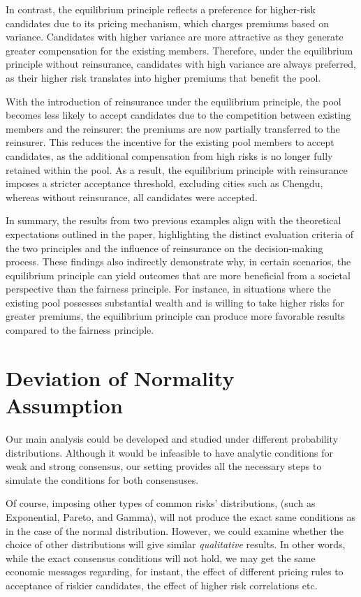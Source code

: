 \documentclass[fleqn,mnsc,nonblindrev]{informs4}
\begin{document}
In contrast, the equilibrium principle reflects a preference for higher-risk candidates due to its pricing mechanism, which charges premiums based on variance. Candidates with higher variance are more attractive as they generate greater compensation for the existing members. Therefore, under the equilibrium principle without reinsurance, candidates with high variance are always preferred, as their higher risk translates into higher premiums that benefit the pool.

With the introduction of reinsurance under the equilibrium principle, the pool becomes less likely to accept candidates due to the competition between existing members and the reinsurer: the premiums are now partially transferred to the reinsurer. This reduces the incentive for the existing pool members to accept candidates, as the additional compensation from high risks is no longer fully retained within the pool. As a result, the equilibrium principle with reinsurance imposes a stricter acceptance threshold, excluding cities such as Chengdu, whereas without reinsurance, all candidates were accepted.

In summary, the results from two previous examples align with the theoretical expectations outlined in the paper, highlighting the distinct evaluation criteria of the two principles and the influence of reinsurance on the decision-making process. These findings also indirectly demonstrate why, in certain scenarios, the equilibrium principle can yield outcomes that are more beneficial from a societal perspective than the fairness principle. For instance, in situations where the existing pool possesses substantial wealth and is willing to take higher risks for greater premiums, the equilibrium principle can produce more favorable results compared to the fairness principle.

\section{Deviation of Normality Assumption}\label{app:simulation}
Our main analysis could be developed and studied under different probability distributions. Although it would be infeasible to have analytic conditions for weak and strong consensus, our setting provides all the necessary steps to simulate the conditions for both consensuses.

Of course, imposing other types of common risks' distributions, (such as  Exponential, Pareto, and Gamma), will not produce the exact same conditions as in the case of the normal distribution. However, we could examine whether the choice of other distributions will give similar \textit{qualitative} results. In other words, while the exact consensus conditions will not hold, we may get the same economic messages regarding, for instant, the effect of different pricing rules to acceptance of riskier candidates, the effect of higher risk correlations etc.
\end{document}
